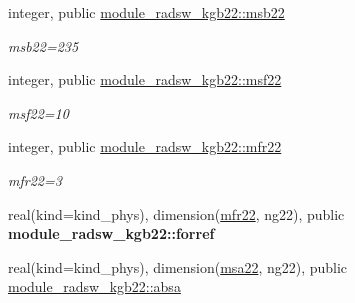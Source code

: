 \begin{DoxyCompactItemize}
integer, public \hyperlink{group__module__radsw__kgbnn_ga3398f8d12ec0349b44197873ac58fd98}{module\+\_\+radsw\+\_\+kgb22\+::msb22}
\begin{DoxyCompactList}\small\item\em msb22=235 \end{DoxyCompactList}\item 
\mbox{\label{group__module__radsw__kgbnn_ga0903a020c9e4a4f7c21911d2ab98fd46}} 
integer, public \hyperlink{group__module__radsw__kgbnn_ga0903a020c9e4a4f7c21911d2ab98fd46}{module\+\_\+radsw\+\_\+kgb22\+::msf22}
\begin{DoxyCompactList}\small\item\em msf22=10 \end{DoxyCompactList}\item 
\mbox{\label{group__module__radsw__kgbnn_ga0afe8facbe4837a22c96a0d2000a20ee}} 
integer, public \hyperlink{group__module__radsw__kgbnn_ga0afe8facbe4837a22c96a0d2000a20ee}{module\+\_\+radsw\+\_\+kgb22\+::mfr22}
\begin{DoxyCompactList}\small\item\em mfr22=3 \end{DoxyCompactList}\item 
\mbox{\label{group__module__radsw__kgbnn_ga509916fac772945555a1b3fd0d002c93}} 
real(kind=kind\+\_\+phys), dimension(\hyperlink{group__module__radsw__kgbnn_ga0afe8facbe4837a22c96a0d2000a20ee}{mfr22}, ng22), public {\bfseries module\+\_\+radsw\+\_\+kgb22\+::forref}
\item 
\mbox{\label{group__module__radsw__kgbnn_ga15ed79e7136ed6d7f11c19a81281af53}} 
real(kind=kind\+\_\+phys), dimension(\hyperlink{namespacemodule__radsw__kgb22_a4134c2cd3b31db5e0adb5c3c2ad87905}{msa22}, ng22), public \hyperlink{group__module__radsw__kgbnn_ga15ed79e7136ed6d7f11c19a81281af53}{module\+\_\+radsw\+\_\+kgb22\+::absa}

\end{DoxyCompactItemize}
